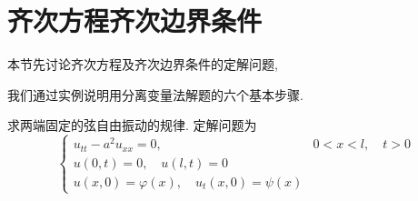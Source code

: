\section{齐次方程齐次边界条件}
\label{sec:homo}
本节先讨论齐次方程及齐次边界条件的定解问题,


我们通过实例说明用分离变量法解题的六个基本步骤.


求两端固定的弦自由振动的规律.
定解问题为
\begin{equation}
    \begin{cases}u_{t t}-a^{2} u_{x x}=0, & 0<x<l, \quad t>0 
        \\ u(0, t)=0, \quad u(l, t)=0 & 
        \\ u(x, 0)=\varphi(x), \quad u_{t}(x, 0)=\psi(x) & 
    \end{cases}
    \label{eq:string_vibration_equation}
\end{equation}

